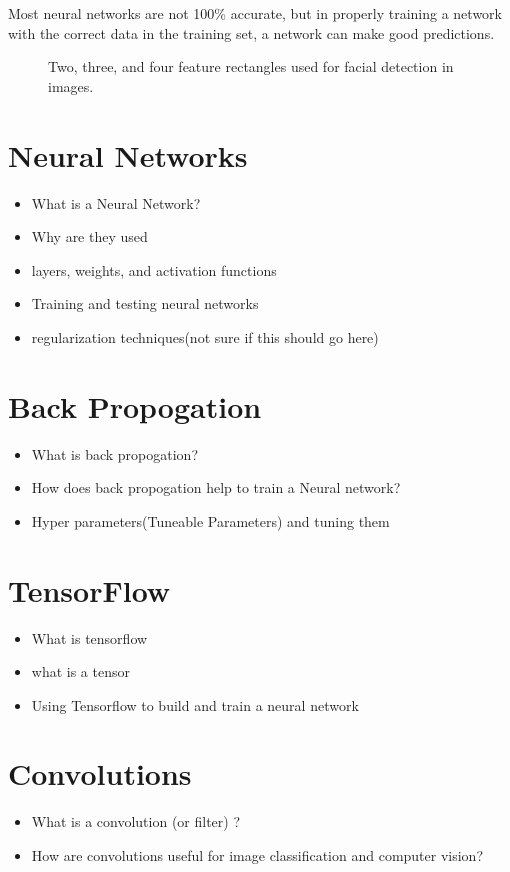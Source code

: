 \documentclass[12pt]{article} %
\begin{document}
	Most neural networks are not 100\% accurate, but in properly training a network with the correct data in the training set, a network can make good predictions. 
	
 
 
	
\begin{figure}[h]
\caption{Two, three, and four feature rectangles used for facial detection in images.}\label{fig: 4}
\end{figure}
	
	
	
	 


\section{Neural Networks}
\begin{itemize}
\item What is a Neural Network?
\item Why are they used
\item layers, weights, and activation functions
\item Training and testing neural networks 
\item regularization techniques(not sure if this should go here)
\end{itemize}


\section{Back Propogation}
\begin{itemize}
\item What is back propogation?
\item How does back propogation help to train a Neural network?
\item Hyper parameters(Tuneable Parameters) and tuning them
\end{itemize}

\section{TensorFlow}
\begin{itemize}
\item What is tensorflow
\item what is a tensor
\item Using Tensorflow to build and train a neural network
\end{itemize}


\section{Convolutions}
\begin{itemize}
\item What is a convolution (or filter) ?
\item How are convolutions useful for image classification and computer vision?
\end{itemize}
\end{document}
